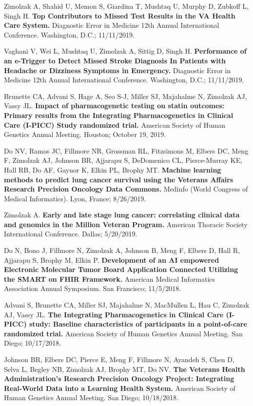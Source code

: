 \documentclass[10pt]{article}
\begin{document}

Zimolzak A, Shahid U, Memon S, Giardina T, Mushtaq U, Murphy D,
Zubkoff L, Singh H. \textbf{Top Contributors to Missed Test Results in
  the VA Health Care System.} Diagnostic Error in Medicine 12th Annual
International Conference. Washington, D.C.; 11/11/2019.

Vaghani V, Wei L, Mushtaq U, Zimolzak A, Sittig D, Singh H.
\textbf{Performance of an e-Trigger to Detect Missed Stroke Diagnosis
  In Patients with Headache or Dizziness Symptoms in Emergency.}
Diagnostic Error in Medicine 12th Annual International Conference.
Washington, D.C.; 11/11/2019.


Brunette CA, Advani S, Hage A, Seo S-J, Miller SJ, Majahalme N,
Zimolzak AJ, Vassy JL. \textbf{Impact of pharmacogenetic testing on
  statin outcomes: Primary results from the Integrating
  Pharmacogenetics in Clinical Care (I-PICC) Study randomized trial.}
American Society of Human Genetics Annual Meeting. Houston; October
19, 2019.

Do NV, Ramos JC, Fillmore NR, Grossman RL, Fitzsimons M, Elbers DC,
Meng F, Zimolzak AJ, Johnson BR, Ajjarapu S, DeDomenico CL,
Pierce-Murray KE, Hall RB, Do AF, Gaynor K, Elkin PL, Brophy MT.
\textbf{Machine learning methods to predict lung cancer survival using
  the Veterans Affairs Research Precision Oncology Data Commons.}
Medinfo (World Congress of Medical Informatics). Lyon, France;
8/26/2019.

Zimolzak A. \textbf{Early and late stage lung cancer: correlating
  clinical data and genomics in the Million Veteran Program.} American
Thoracic Society International Conference. Dallas; 5/20/2019.

Do N, Bono J, Fillmore N, Zimolzak A, Johnson B, Meng F, Elbers D,
Hall R, Ajjarapu S, Brophy M, Elkin P. \textbf{Development of an AI
  empowered Electronic Molecular Tumor Board Application Connected
  Utilizing the SMART on FHIR Framework.} American Medical Informatics
Association Annual Symposium. San Francisco; 11/5/2018.

Advani S, Brunette CA, Miller SJ, Majahalme N, MacMullen L, Hau C,
Zimolzak AJ, Vassy JL. \textbf{The Integrating Pharmacogenetics in
  Clinical Care (I-PICC) study: Baseline characteristics of
  participants in a point-of-care randomized trial.} American Society
of Human Genetics Annual Meeting. San Diego; 10/17/2018.

Johnson BR, Elbers DC, Pierce E, Meng F, Fillmore N, Ayandeh S, Chen
D, Selva L, Begley NB, Zimolzak AJ, Brophy MT, Do NV. \textbf{The
  Veterans Health Administration's Research Precision Oncology
  Project: Integrating Real-World Data into a Learning Health System.}
American Society of Human Genetics Annual Meeting. San Diego;
10/18/2018.
\end{document}
